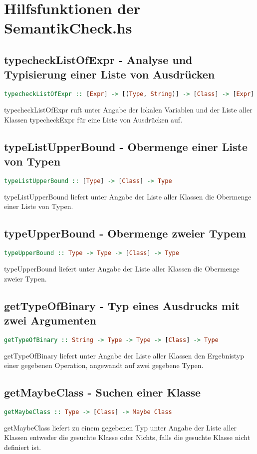 \documentclass[a4paper,10pt]{article}
\begin{document}
\newpage
\section{Hilfsfunktionen der SemantikCheck.hs}
\subsection{typecheckListOfExpr - Analyse und Typisierung einer Liste von Ausdrücken}
\begin{lstlisting}[language=Haskell]
typecheckListOfExpr :: [Expr] -> [(Type, String)] -> [Class] -> [Expr]
\end{lstlisting}
typecheckListOfExpr ruft unter Angabe der lokalen Variablen und der Liste aller Klassen typecheckExpr für eine Liste von Ausdrücken auf.
\\
\subsection{typeListUpperBound - Obermenge einer Liste von Typen}
\begin{lstlisting}[language=Haskell]
typeListUpperBound :: [Type] -> [Class] -> Type
\end{lstlisting}
typeListUpperBound liefert unter Angabe der Liste aller Klassen die Obermenge einer Liste von Typen.
\\
\subsection{typeUpperBound - Obermenge zweier Typem}
\begin{lstlisting}[language=Haskell]
typeUpperBound :: Type -> Type -> [Class] -> Type
\end{lstlisting}
typeUpperBound liefert unter Angabe der Liste aller Klassen die Obermenge zweier Typen.
\\
\subsection{getTypeOfBinary - Typ eines Ausdrucks mit zwei Argumenten}
\begin{lstlisting}[language=Haskell]
getTypeOfBinary :: String -> Type -> Type -> [Class] -> Type
\end{lstlisting}
getTypeOfBinary liefert unter Angabe der Liste aller Klassen den Ergebnistyp einer gegebenen Operation, angewandt auf zwei gegebene Typen.
\\
\subsection{getMaybeClass - Suchen einer Klasse}
\begin{lstlisting}[language=Haskell]
getMaybeClass :: Type -> [Class] -> Maybe Class
\end{lstlisting}
getMaybeClass liefert zu einem gegebenen Typ unter Angabe der Liste aller Klassen entweder die gesuchte Klasse oder Nichts,
falls die gesuchte Klasse nicht definiert ist.
\\
\end{document}
